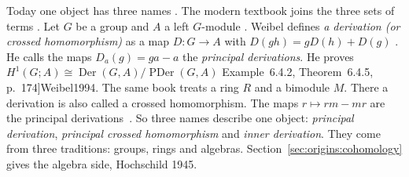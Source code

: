 Today one object has three names \cite[Definition~6.4.1, p.~174]{Weibel1994}.
The modern textbook joins the three sets of terms \cite[Definition~6.4.1,
p.~174]{Weibel1994}. Let $G$ be a group and $A$ a left $G$-module
\cite[Definition~6.4.1, p.~174]{Weibel1994}. Weibel defines \emph{a derivation
(or crossed homomorphism)} as a map $D\colon G \to A$ with $D(gh) = gD(h) +
D(g)$ \cite[Definition~6.4.1, p.~174]{Weibel1994}. He calls the maps $D_a(g) =
ga - a$ the \emph{principal derivations}. He proves $H^1(G;A) \cong
\operatorname{Der}(G,A)/\operatorname{PDer}(G,A)$%
Example~6.4.2, Theorem~6.4.5, p.~174]{Weibel1994}. The same book treats a ring $R$ and
a bimodule $M$. There a derivation is also called a crossed homomorphism. The
maps $r \mapsto rm - mr$ are the principal derivations~\cite[\S 9.2,
p.~301]{Weibel1994}. So three names describe one object: \emph{principal
derivation}, \emph{principal crossed homomorphism} and \emph{inner
derivation}. They come from three traditions: groups, rings and algebras.
Section~\ref{sec:origins:cohomology} gives the algebra side, Hochschild 1945.
